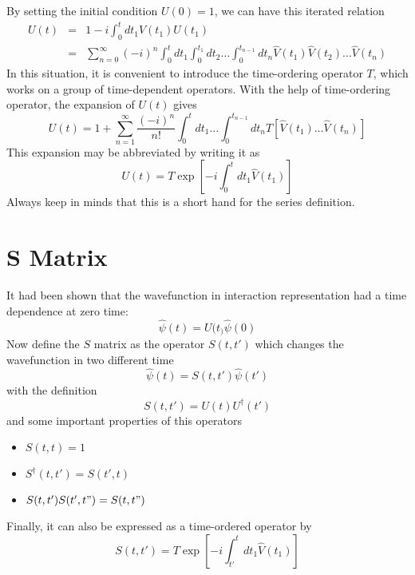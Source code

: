 By setting the initial condition $U(0)=1$, we can have this iterated relation
\begin{eqnarray}\label{2.18}
  U(t)&=&1-i\int_0^t dt_1 \hat{V}(t_1)U(t_1)\\
  &=& \sum_{n=0}^\infty (-i)^n \int_0^t dt_1 \int_0^{t_1} dt_2 \dots \int_0^{t_{n-1}} dt_n \hat{V}(t_1) \hat{V}(t_2) \dots \hat{V}(t_n) \nonumber
\end{eqnarray}
In this situation, it is convenient to introduce the time-ordering operator $T$, which works on a group of time-dependent operators.
With the help of time-ordering operator, the expansion of $U(t)$ gives
\begin{equation}
  U(t)=1 + \sum_{n=1}^\infty \frac{(-i)^n}{n!} \int_0^t dt_1 \dots \int_0^{t_{n-1}} dt_n T[ \hat{V}(t_1)\dots \hat{V}(t_n) ] \label{2.26}
\end{equation}
This expansion may be abbreviated by writing it as
\begin{equation}\label{2.27}
  U(t) = T \exp \left[ -i \int_0^t dt_1 \hat{V}(t_1) \right]
\end{equation}
Always keep in minds that this is a short hand for the series definition.

\section{S Matrix}\label{s2.2}
It had been shown that the wavefunction in interaction representation had a time dependence at zero time:
\begin{equation}
  \hat{\psi}(t) = U(t_) \hat{\psi}(0) \label{2.28}
\end{equation}
Now define the $S$ matrix as the operator $S(t,t')$ which changes the wavefunction in two different time
\begin{equation}
  \hat{\psi}(t) = S(t,t') \hat{\psi}(t') \label{2.29}
\end{equation}
with the definition
\begin{equation}
  S(t,t')=U(t)U^\dagger(t') \label{2.31}
\end{equation}
and some important properties of this operators
\begin{itemize}
  \item $S(t,t)=1$
  \item $S^\dagger(t,t') = S(t',t)$
  \item $S(t,t')S(t',t")=S(t,t")$
\end{itemize}
Finally, it can also be expressed as a time-ordered operator by
\begin{equation}
  S(t,t') =T \exp [ -i \int_{t'}^t dt_1 \hat{V}(t_1) ] \label{2.33}
\end{equation}

